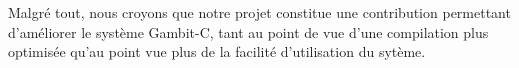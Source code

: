 \documentclass[letterpaper,12pt]{book}
\begin{document}
  Malgré tout, nous croyons que notre projet constitue une
  contribution permettant d'améliorer le système Gambit-C, tant au
  point de vue d'une compilation plus optimisée qu'au point vue plus
  de la facilité d'utilisation du sytème. 





\end{document}
